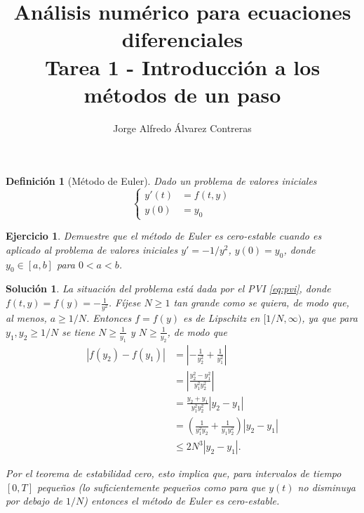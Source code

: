 \documentclass[11pt,letterpaper]{article}
\title{Análisis numérico para ecuaciones diferenciales \\
Tarea 1 - Introducción a los métodos de un paso}
\author{Jorge Alfredo Álvarez Contreras}
\newtheorem{definition}{Definición}
\newtheorem{exercise}{Ejercicio}
\newtheorem*{sol}{Solución}
\begin{document}
\maketitle

\begin{definition}[Método de Euler]
  Dado un problema de valores iniciales
  \begin{equation}\label{eq:pvi}
    \left\{
      \begin{aligned}
        y'(t) &= f(t,y) \\
        y(0) &= y_0
      \end{aligned}
    \right.
  \end{equation}
\end{definition}

\begin{exercise}
  Demuestre que el método de Euler es cero-estable cuando es aplicado
  al problema de valores iniciales $y'=-1/y^{2}$, $y(0)=y_0$, donde
  $y_0\in[a,b]$ para $0<a<b$.
\end{exercise}

\begin{sol}
  La situación del problema está dada por el PVI \eqref{eq:pvi},
  donde $f(t,y)=f(y)=-\frac{1}{y^{2}}$.
  Fíjese $N\geq 1$ tan grande como se quiera,
  de modo que, al menos, $a\geq 1 / N$. Entonces $f=f(y)$ es de
  Lipschitz en $[1 / N,\infty)$, ya que para $y_1,y_2\geq 1 / N$ se
  tiene $N\geq \frac{1}{y_1}$ y $N\geq \frac{1}{y_2}$, de modo que
  \begin{align}
    |f(y_2)-f(y_1)|
    &= \left|-\frac{1}{y_2^{2}}+\frac{1}{y_1^{2}}\right| \\
    &= \left|\frac{y_2^{2}-y_1^{2}}{y_1^{2}y_2^{2}}\right| \\
    &= \frac{y_2+y_1}{y_1^{2}y_2^{2}} |y_2-y_1| \\
    &=
    \left(
      \frac{1}{y_1^{2}y_2}
      +
      \frac{1}{y_1y_2^{2}} 
    \right)
    |y_2-y_1| \\
    &\leq 2N^{3} |y_2-y_1|
  .\end{align}

  Por el teorema de estabilidad cero, esto implica que, para
  intervalos de tiempo $[0,T]$ pequeños (lo suficientemente pequeños
  como para que $y(t)$ no disminuya por debajo de $1 / N$)
  entonces el método de Euler es cero-estable.
\end{sol}
\end{document}
